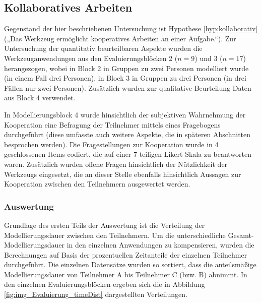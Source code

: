 
\subsection{Kollaboratives Arbeiten} %
\label{sub:kollaboratives_arbeiten}

Gegenstand der hier beschriebenen Untersuchung ist Hypothese \ref{hyp:kollaborativ} („Das Werkzeug ermöglicht kooperatives Arbeiten an einer Aufgabe.“). Zur Untersuchung der quantitativ beurteilbaren Aspekte wurden die Werkzeuganwendungen aus den Evaluierungsblöcken 2 ($n=9$) und 3 ($n=17$) herangezogen, wobei in Block 2 in Gruppen zu zwei Personen modelliert wurde (in einem Fall drei Personen), in Block 3 in Gruppen zu drei Personen (in drei Fällen nur zwei Personen). Zusätzlich wurden zur qualitative Beurteilung Daten aus Block 4 verwendet.

In Modellierungsblock 4 wurde hinsichtlich der subjektiven Wahrnehmung der Kooperation eine Befragung der Teilnehmer mittels eines Fragebogens durchgeführt (diese umfasste auch weitere Aspekte, die in späteren Abschnitten besprochen werden). Die Fragestellungen zur Kooperation wurde in 4 geschlossenen Items codiert, die auf einer 7-teiligen Likert-Skala zu beantworten waren. Zusätzlich wurden offene Fragen hinsichtlich der Nützlichkeit der Werkzeugs eingesetzt, die an dieser Stelle ebenfalls hinsichtlich Aussagen zur Kooperation zwischen den Teilnehmern ausgewertet werden.

\subsubsection{Auswertung} %

Grundlage des ersten Teils der Auswertung ist die Verteilung der Modellierungsdauer zwischen den Teilnehmern. Um die unterschiedliche Gesamt-Modellierungsdauer in den einzelnen Anwendungen zu kompensieren, wurden die Berechnungen auf Basis der prozentuellen Zeitanteile der einzelnen Teilnehmer durchgeführt. Die einzelnen Datensätze wurden so sortiert, dass die anteilsmäßige Modellierungsdauer von Teilnehmer A bis Teilnehmer C (bzw. B) abnimmt. In den einzelnen Evaluierungsblöcken ergeben sich die in Abbildung \ref{fig:img_Evaluierung_timeDist} dargestellten Verteilungen.

